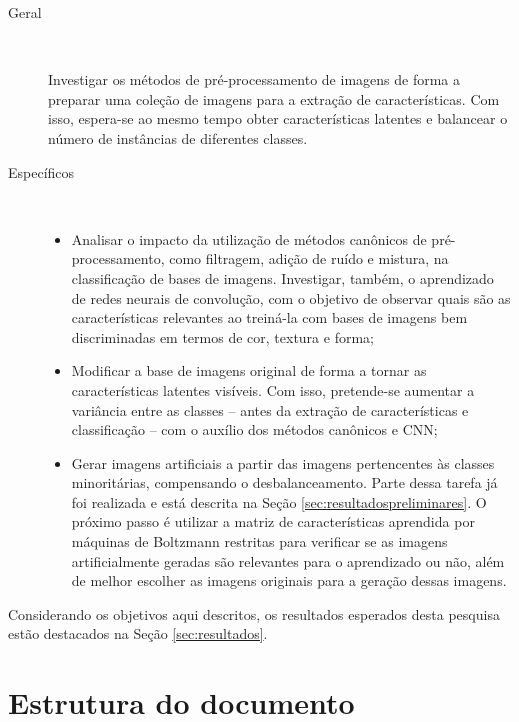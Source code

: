 \begin{description}
\item[Geral] \

Investigar os métodos de pré-processamento de imagens de forma a preparar uma coleção de imagens para a extração de características. Com isso, espera-se ao mesmo tempo obter características latentes e balancear o número de instâncias de diferentes classes.

\item[Específicos] \

  \begin{itemize}
      \item Analisar o impacto da utilização de métodos canônicos de pré-processamento, como filtragem, adição de ruído e mistura, na classificação de bases de imagens. Investigar, também, o aprendizado de redes neurais de convolução, com o objetivo de observar quais são as características relevantes ao treiná-la com bases de imagens bem discriminadas em termos de cor, textura e forma;


      \item Modificar a base de imagens original de forma a tornar as características latentes visíveis. Com isso, pretende-se aumentar a variância entre as classes -- antes da extração de características e classificação -- com o auxílio dos métodos canônicos e CNN;

      \item Gerar imagens artificiais a partir das imagens pertencentes às classes minoritárias, compensando o desbalanceamento. Parte dessa tarefa já foi realizada e está descrita na Seção \ref{sec:resultadospreliminares}. O próximo passo é utilizar a matriz de características aprendida por máquinas de Boltzmann restritas para verificar se as imagens artificialmente geradas são relevantes para o aprendizado ou não, além de melhor escolher as imagens originais para a geração dessas imagens.
  \end{itemize}
\end{description}

Considerando os objetivos aqui descritos, os resultados esperados desta pesquisa estão destacados na Seção \ref{sec:resultados}.

\section{Estrutura do documento}

